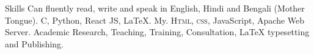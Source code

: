 \begin{rubric}{Skills}
	\entry*[Languages]
		Can fluently read, write and speak in English, Hindi and Bengali (Mother Tongue).
		C, Python, React JS, LaTeX.
	\entry*[Databases]
		My.
		\textsc{Html, css}, JavaScript, Apache Web Server.
	\entry*[Misc.]
		Academic Research, Teaching, Training, Consultation, LaTeX typesetting and Publishing.
	\end{rubric}
	
